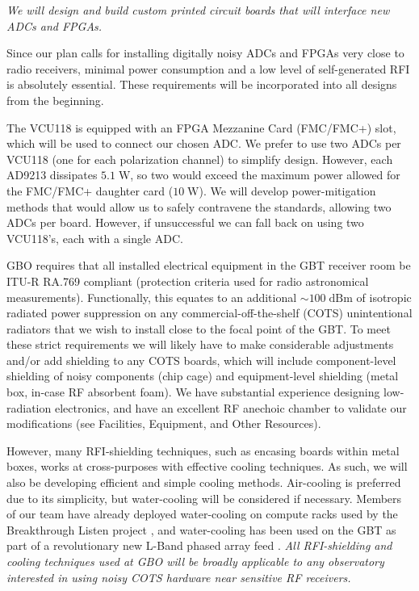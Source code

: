 \documentclass[10pt]{myNSF}
\begin{document}
\label{sec:adc_fpga_integration}

\emph{We will design and build custom printed circuit boards that will
  interface new ADCs and FPGAs.}

Since our plan calls for installing digitally noisy ADCs and FPGAs
very close to radio receivers, minimal power consumption and a low
level of self-generated RFI is absolutely essential.  These
requirements will be incorporated into all designs from the beginning.

The VCU118 is equipped with an FPGA Mezzanine Card (FMC/FMC+) slot,
which will be used to connect our chosen ADC.  We prefer to use two
ADCs per VCU118 (one for each polarization channel) to simplify
design.  However, each AD9213 dissipates $5.1\; \mathrm{W}$, so two
would exceed the maximum power allowed for the FMC/FMC+ daughter card
($10\; \mathrm{W}$).  We will develop power-mitigation methods that
would allow us to safely contravene the standards, allowing two ADCs
per board.  However, if unsuccessful we can fall back on using two
VCU118's, each with a single ADC.

GBO requires that all installed electrical equipment in the GBT
receiver room be ITU-R RA.769 compliant (protection criteria used for
radio astronomical measurements). Functionally, this equates to an
additional $\sim 100\; \mathrm{dBm}$ of isotropic radiated power
suppression on any commercial-off-the-shelf (COTS) unintentional
radiators that we wish to install close to the focal point of the GBT.
To meet these strict requirements we will likely have to make
considerable adjustments and/or add shielding to any COTS boards,
which will include component-level shielding of noisy components (chip
cage) and equipment-level shielding (metal box, in-case RF absorbent
foam). We have substantial experience designing low-radiation
electronics, and have an excellent RF anechoic chamber to validate our
modifications (see Facilities, Equipment, and Other Resources).

However, many RFI-shielding techniques, such as encasing boards within
metal boxes, works at cross-purposes with effective cooling
techniques. As such, we will also be developing efficient and simple
cooling methods.  Air-cooling is preferred due to its simplicity, but
water-cooling will be considered if necessary.  Members of our team
have already deployed water-cooling on compute racks used by the
Breakthrough Listen project \cite{mpl+17}, and water-cooling has been
used on the GBT as part of a revolutionary new L-Band phased array
feed \cite{rpb+18}.  \emph{All RFI-shielding and cooling techniques
  used at GBO will be broadly applicable to any observatory interested
  in using noisy COTS hardware near sensitive RF receivers.}
\end{document}
